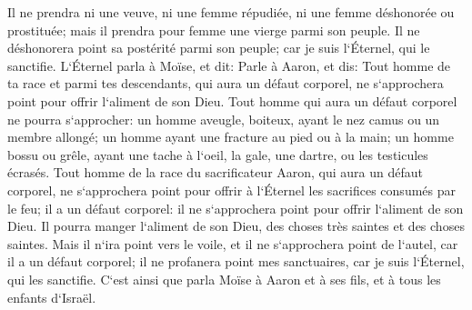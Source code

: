 \verse Il ne prendra ni une veuve, ni une femme répudiée, ni une femme déshonorée ou prostituée; mais il prendra pour femme une vierge parmi son peuple. 
\verse Il ne déshonorera point sa postérité parmi son peuple; car je suis l`Éternel, qui le sanctifie. 
\verse L`Éternel parla à Moïse, et dit: 
\verse Parle à Aaron, et dis: Tout homme de ta race et parmi tes descendants, qui aura un défaut corporel, ne s`approchera point pour offrir l`aliment de son Dieu. 
\verse Tout homme qui aura un défaut corporel ne pourra s`approcher: un homme aveugle, boiteux, ayant le nez camus ou un membre allongé; 
\verse un homme ayant une fracture au pied ou à la main; 
\verse un homme bossu ou grêle, ayant une tache à l`oeil, la gale, une dartre, ou les testicules écrasés. 
\verse Tout homme de la race du sacrificateur Aaron, qui aura un défaut corporel, ne s`approchera point pour offrir à l`Éternel les sacrifices consumés par le feu; il a un défaut corporel: il ne s`approchera point pour offrir l`aliment de son Dieu. 
\verse Il pourra manger l`aliment de son Dieu, des choses très saintes et des choses saintes. 
\verse Mais il n`ira point vers le voile, et il ne s`approchera point de l`autel, car il a un défaut corporel; il ne profanera point mes sanctuaires, car je suis l`Éternel, qui les sanctifie. 
\verse C`est ainsi que parla Moïse à Aaron et à ses fils, et à tous les enfants d`Israël. 

